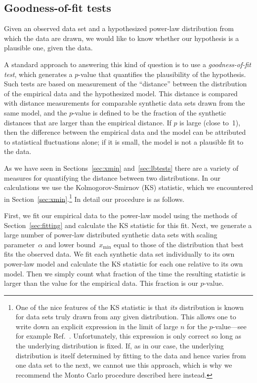 \documentclass[final]{siamltex}
\newcommand{\defn}{\textit}
\newcommand{\xmin}{\ensuremath{x_{\min}}}
\begin{document}
\subsection{Goodness-of-fit tests}
\label{sec:testing}
Given an observed data set and a hypothesized power-law distribution from
which the data are drawn, we would like to know whether our hypothesis is a
plausible one, given the data.

A standard approach to answering this kind of question is to use a
\defn{goodness-of-fit test}, which generates a $p$-value that quantifies
the plausibility of the hypothesis.  Such tests are based on measurement of
the ``distance'' between the distribution of the empirical data and the
hypothesized model.  This distance is compared with distance measurements
for comparable synthetic data sets drawn from the same model, and the
$p$-value is defined to be the fraction of the synthetic distances that are
larger than the empirical distance.  If $p$ is large (close to~1), then the
difference between the empirical data and the model can be attributed to
statistical fluctuations alone; if it is small, the model is not a
plausible fit to the data.

As we have seen in Sections~\ref{sec:xmin} and~\ref{sec:lbtests} there are
a variety of measures for quantifying the distance between two
distributions.  In our calculations we use the Kolmogorov-Smirnov (KS)
statistic, which we encountered in Section~\ref{sec:xmin}.\footnote{One of
 the nice features of the KS statistic is that \emph{its} distribution is
 known for data sets truly drawn from any given distribution.  This allows
 one to write down an explicit expression in the limit of large $n$ for
 the $p$-value---see for example Ref.~\cite{Numerical-Recipes-in-C}.
 Unfortunately, this expression is only correct so long as the underlying
 distribution is fixed.  If, as in our case, the underlying distribution
 is itself determined by fitting to the data and hence varies from one
 data set to the next, we cannot use this approach, which is why we
 recommend the Monto Carlo procedure described here instead.}  In detail
our procedure is as follows.

First, we fit our empirical data to the power-law model using the methods
of Section~\ref{sec:fitting} and calculate the KS statistic for this fit.
Next, we generate a large number of power-law distributed synthetic data
sets with scaling parameter~$\alpha$ and lower bound~$\xmin$ equal to those
of the distribution that best fits the observed data.  We fit each
synthetic data set individually to its own power-law model and calculate
the KS statistic for each one relative to its own model.  Then we simply
count what fraction of the time the resulting statistic is larger than the
value for the empirical data.  This fraction is our $p$-value.
\end{document}
